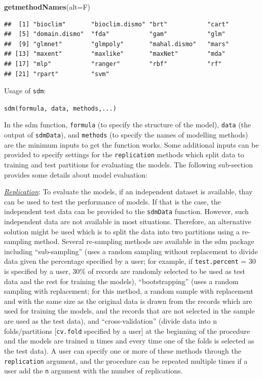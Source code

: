 \documentclass[
]{article}
\newenvironment{Shaded}{\begin{snugshade}}{\end{snugshade}}
\newcommand{\AttributeTok}[1]{\textcolor[rgb]{0.13,0.29,0.53}{#1}}
\newcommand{\FunctionTok}[1]{\textcolor[rgb]{0.13,0.29,0.53}{\textbf{#1}}}
\newcommand{\NormalTok}[1]{#1}
\begin{document}
\begin{Shaded}
\begin{Highlighting}[]
\FunctionTok{getmethodNames}\NormalTok{(}\AttributeTok{alt=}\NormalTok{F)}
\end{Highlighting}
\end{Shaded}

\begin{verbatim}
##  [1] "bioclim"       "bioclim.dismo" "brt"           "cart"         
##  [5] "domain.dismo"  "fda"           "gam"           "glm"          
##  [9] "glmnet"        "glmpoly"       "mahal.dismo"   "mars"         
## [13] "maxent"        "maxlike"       "maxNet"        "mda"          
## [17] "mlp"           "ranger"        "rbf"           "rf"           
## [21] "rpart"         "svm"
\end{verbatim}

Usage of \texttt{sdm}:

\texttt{sdm(formula,\ data,\ methods,...)}

In the sdm function, \texttt{formula} (to specify the structure of the
model), \texttt{data} (the output of \texttt{sdmData}), and
\texttt{methods} (to specify the names of modelling methods) are the
minimum inputs to get the function works. Some additional inputs can be
provided to specify settings for the \texttt{replication} methods which
split data to training and test partitions for evaluating the models.
The following sub-section provides some details about model evaluation:

\uline{\textit{Replication}}: To evaluate the models, if an independent
dataset is available, thay can be used to test the performance of
models. If that is the case, the independent test data can be provided
to the \texttt{sdmData} function. However, such independent data are not
available in most situations. Therefore, an alternative solution might
be used which is to split the data into two partitions using a
re-sampling method. Several re-sampling methods are available in the sdm
package including ``sub-sampling'' (uses a random sampling without
replacement to divide data given the percentage specified by a user; for
example, if \texttt{test.percent} = 30 is specified by a user, 30\% of
records are randomly selected to be used as test data and the rest for
training the models), ``bootstrapping'' (uses a random sampling with
replacement; for this method, a random sample with replacement and with
the same size as the original data is drawn from the records which are
used for training the models, and the records that are not selected in
the sample are used as the test data), and ``cross-validation'' (divide
data into n folds/partitions {[}\texttt{cv.fold} specified by a user{]}
at the beginning of the procedure and the models are trained n times and
every time one of the folds is selected as the test data). A user can
specify one or more of these methods through the \texttt{replication}
argument, and the procedure can be repeated multiple times if a user add
the \texttt{n} argument with the number of replications.
\end{document}

